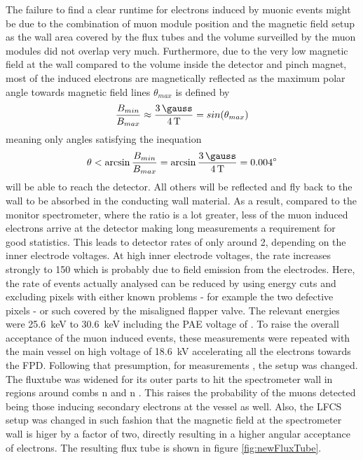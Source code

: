   
  The failure to find a clear runtime for electrons induced by muonic events might be due to the combination of muon module position and the magnetic field setup as the wall area covered by the flux tubes and the volume surveilled by the muon modules did not overlap very much. Furthermore, due to the very low magnetic field at the wall compared to the volume inside the detector and pinch magnet, most of the induced electrons are magnetically reflected as the maximum polar angle towards magnetic field lines $\theta_{max}$ is defined by
  \begin{equation}
  	\frac{B_{min}}{B_{max}} \approx \frac{\SI{3}{\gauss}}{\SI{4}{\tesla}} = sin(\theta_{max})
  \end{equation}
  meaning only angles satisfying the inequation
  \begin{equation}
  	\theta < \arcsin{\frac{B_{min}}{B_{max}}} = \arcsin{\frac{\SI{3}{\gauss}}{\SI{4}{\tesla}}} = \SI{0.004}{\degree}
  \end{equation}
	will be able to reach the detector. All others will be reflected and fly back to the wall to be absorbed in the conducting wall material. 
	As a result, compared to the monitor spectrometer, where the ratio is a lot greater, less of the muon induced electrons arrive at the detector making long measurements a requirement for good statistics. This leads to detector rates of only around \SI{2}{\cps}, depending on the inner electrode voltages.
	At high inner electrode voltages, the rate increases strongly to \SI{150}{\cps} which is probably due to field emission from the electrodes. Here, the rate of events actually analysed can be reduced by using energy cuts and excluding pixels with either known problems - for example the two defective pixels - or such covered by the misaligned flapper valve. The relevant energies were \SI{25.6}{\kilo\electronvolt} to \SI{30.6}{\kilo\electronvolt} including the PAE voltage of .
	To raise the overall acceptance of the muon induced events, these measurements were repeated with the main vessel on high voltage of \SI{18.6}{\kilo\volt} accelerating all the electrons towards the FPD.
	Following that presumption, for measurements , the setup was changed. The fluxtube was widened for its outer parts to hit the spectrometer wall in regions around combs n and n . This raises the probability of the muons detected being those inducing secondary electrons at the vessel as well. Also, the LFCS setup was changed in such fashion that the magnetic field at the spectrometer wall is higer by a factor of two, directly resulting in a higher angular acceptance of electrons. The resulting flux tube is shown in figure \ref{fig:newFluxTube}. 
    


